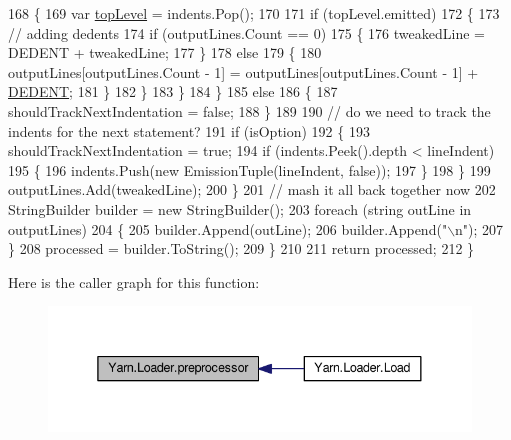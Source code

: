 \begin{DoxyCode}
168                         \{
169                             var \hyperlink{a00351_a8b7e5c0b2c6870eaa8f9454b4f33678b}{topLevel} = indents.Pop();
170 
171                             \textcolor{keywordflow}{if} (topLevel.emitted)
172                             \{
173                                 \textcolor{comment}{// adding dedents}
174                                 \textcolor{keywordflow}{if} (outputLines.Count == 0)
175                                 \{
176                                     tweakedLine = DEDENT + tweakedLine;
177                                 \}
178                                 \textcolor{keywordflow}{else}
179                                 \{
180                                     outputLines[outputLines.Count - 1] = outputLines[outputLines.Count - 1]
       + \hyperlink{a00351_a83653c3e52fa74614e655a91ad2b7181}{DEDENT};
181                                 \}
182                             \}
183                         \}
184                     \}
185                     \textcolor{keywordflow}{else}
186                     \{
187                         shouldTrackNextIndentation = \textcolor{keyword}{false};
188                     \}
189 
190                     \textcolor{comment}{// do we need to track the indents for the next statement?}
191                     \textcolor{keywordflow}{if} (isOption)
192                     \{
193                         shouldTrackNextIndentation = \textcolor{keyword}{true};
194                         \textcolor{keywordflow}{if} (indents.Peek().depth < lineIndent)
195                         \{
196                             indents.Push(\textcolor{keyword}{new} EmissionTuple(lineIndent, \textcolor{keyword}{false}));
197                         \}
198                     \}
199                     outputLines.Add(tweakedLine);
200                 \}
201                 \textcolor{comment}{// mash it all back together now}
202                 StringBuilder builder = \textcolor{keyword}{new} StringBuilder();
203                 \textcolor{keywordflow}{foreach} (\textcolor{keywordtype}{string} outLine \textcolor{keywordflow}{in} outputLines)
204                 \{
205                     builder.Append(outLine);
206                     builder.Append(\textcolor{stringliteral}{"\(\backslash\)n"});
207                 \}
208                 processed = builder.ToString();
209             \}
210 
211             \textcolor{keywordflow}{return} processed;
212         \}
\end{DoxyCode}


Here is the caller graph for this function\-:
\nopagebreak
\begin{figure}[H]
\begin{center}
\leavevmode
\includegraphics[width=338pt]{a00135_a0b09a29edd2ed13d52203f1b71a47081_icgraph}
\end{center}
\end{figure}


